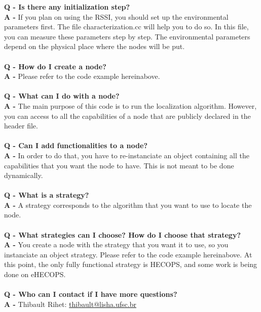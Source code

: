 \documentclass[a4paper,10pt]{article}
\begin{document}
\noindent
\textbf{Q - Is there any initialization step?}\\
\textbf{A - }If you plan on using the RSSI, you should set up the environmental parameters first. The file characterization.cc will help you to do so.
In this file, you can measure these parameters step by step. The environmental parameters depend on the physical place where the nodes will be put.
\\ \\
\textbf{Q - How do I create a node?} \\
\textbf{A - }Please refer to the code example hereinabove.
\\ \\
\textbf{Q - What can I do with a node?} \\
\textbf{A - }The main purpose of this code is to run the localization algorithm. However, you can access to all the capabilities of a node that are
publicly declared in the header file.
\\ \\
\textbf{Q - Can I add functionalities to a node?} \\
\textbf{A - }In order to do that, you have to re-instanciate an object containing all the capabilities that you want the node to have. This is not
meant to be done dynamically.
\\ \\
\textbf{Q - What is a strategy?} \\
\textbf{A - }A strategy corresponds to the algorithm that you want to use to locate the node.
\\ \\
\textbf{Q - What strategies can I choose? How do I choose that strategy?} \\
\textbf{A - }You create a node with the strategy that you want it to use, so you instanciate an object strategy. Please refer to the code example 
hereinabove. At this point, the only fully functional strategy is HECOPS, and some work is being done on eHECOPS.
\\ \\
\textbf{Q - Who can I contact if I have more questions?} \\
\textbf{A - }Thibault Rihet: \href{mailto:thibault@lisha.ufsc.br}{thibault@lisha.ufsc.br}


\newpage
\end{document}
